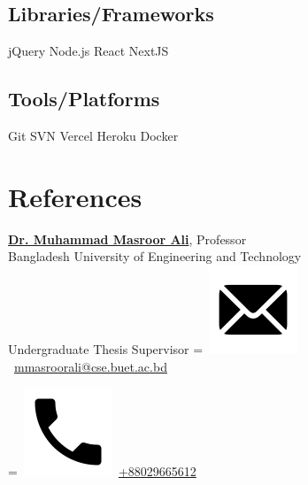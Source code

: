 \documentclass[]{plushcv}
\begin{document}
\begin{minipage}[t]{0.31\textwidth}
\subsection{Libraries/Frameworks}
\sectionsep
jQuery \textbullet{} Node.js \textbullet{} React \textbullet{} NextJS \\
\sectionsep
\subsection{Tools/Platforms}
\sectionsep
Git \textbullet{} SVN \textbullet{} Vercel \textbullet{} Heroku \textbullet{} Docker \\
\sectionsep


\sectionsep



\section{References} 
\href{https://cse.buet.ac.bd/faculty_list/detail/mmasroorali}{\textbf{Dr. Muhammad Masroor Ali}}, Professor 
\\Bangladesh University of Engineering and Technology \\
\textbullet{} Undergraduate Thesis Supervisor
\begingroup
{}=\hbox{
\includegraphics[scale=0.1,trim={0 1cm 0cm 0cm}]{icons/main/email.png}\hspace{0.3cm} \href{mailto:mmasroorali@cse.buet.ac.bd}{mmasroorali@cse.buet.ac.bd}
}
\parbox{\wd0}{}
\endgroup
\begingroup
{}=\hbox{
\includegraphics[scale=0.1,trim={0 1.25cm -0.4cm 0cm}]{icons/main/phone.png}\hspace{0.3cm}
\href{tel:+88029665612}{+88029665612}
}
\parbox{\wd0}{}\endgroup
\\


\end{minipage}
\end{document}
